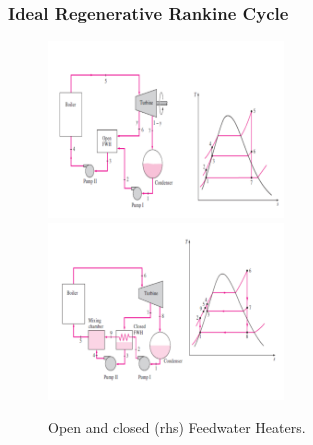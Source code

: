 \documentclass[10pt,compress,handout,ignorenonframetext]{beamer}
\begin{document}
\begin{frame}
 \frametitle{Ideal Regenerative Rankine Cycle}
    \begin{figure}%
     \begin{center}
      \includegraphics[width=6.25cm,clip]{./Pics/Regenerative_Rankine_Cycle_OpenFWH}
      \includegraphics[width=6.25cm,clip]{./Pics/Regenerative_Rankine_Cycle_ClosedFWH}
\caption{Open and closed (rhs) Feedwater Heaters.}
     \end{center}
    \end{figure}  
\end{frame}
\end{document}
